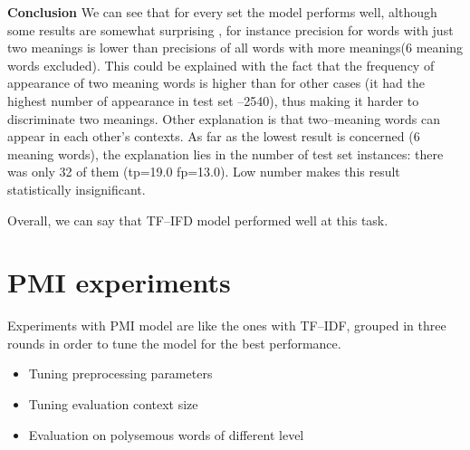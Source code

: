 \textbf{Conclusion}
We can see that for every set the model performs well, although some results are somewhat surprising
, for instance precision for words with just two meanings is lower than precisions of all words with 
more meanings(6 meaning words excluded). This could be explained with the fact that the frequency of appearance 
of two meaning  words is higher than for other cases (it had the highest number of appearance in test
set --2540), thus making it harder to discriminate two meanings. Other explanation is that two--meaning words can appear in each other's contexts. As far as the lowest result is concerned (6 meaning words), the explanation lies in the number of test set instances: there was only 32 of them (tp=19.0 fp=13.0). Low number makes this result statistically insignificant. 

Overall, we can say that TF--IFD model performed well at this task. 

\section{PMI experiments} 
Experiments  with PMI model are like the ones with TF--IDF, grouped in three rounds in order to tune
the model for the best performance. 
\begin{itemize}
\item Tuning preprocessing parameters
\item Tuning evaluation context size
\item Evaluation on polysemous words of different level
\end{itemize}

